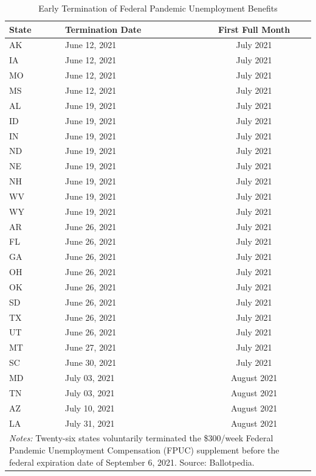 \begin{table}[htbp]
\centering
\caption{Early Termination of Federal Pandemic Unemployment Benefits}
\label{tab:treatment_timing}
\begin{tabular}{llc}
\hline\hline
State & Termination Date & First Full Month \\
\hline
AK & June 12, 2021 & July 2021 \\
IA & June 12, 2021 & July 2021 \\
MO & June 12, 2021 & July 2021 \\
MS & June 12, 2021 & July 2021 \\
AL & June 19, 2021 & July 2021 \\
ID & June 19, 2021 & July 2021 \\
IN & June 19, 2021 & July 2021 \\
ND & June 19, 2021 & July 2021 \\
NE & June 19, 2021 & July 2021 \\
NH & June 19, 2021 & July 2021 \\
WV & June 19, 2021 & July 2021 \\
WY & June 19, 2021 & July 2021 \\
AR & June 26, 2021 & July 2021 \\
FL & June 26, 2021 & July 2021 \\
GA & June 26, 2021 & July 2021 \\
OH & June 26, 2021 & July 2021 \\
OK & June 26, 2021 & July 2021 \\
SD & June 26, 2021 & July 2021 \\
TX & June 26, 2021 & July 2021 \\
UT & June 26, 2021 & July 2021 \\
MT & June 27, 2021 & July 2021 \\
SC & June 30, 2021 & July 2021 \\
MD & July 03, 2021 & August 2021 \\
TN & July 03, 2021 & August 2021 \\
AZ & July 10, 2021 & August 2021 \\
LA & July 31, 2021 & August 2021 \\
\hline
\multicolumn{3}{p{10cm}}{\footnotesize \textit{Notes:} Twenty-six states voluntarily terminated the \$300/week Federal Pandemic Unemployment Compensation (FPUC) supplement before the federal expiration date of September 6, 2021. Source: Ballotpedia.} \\
\hline\hline
\end{tabular}
\end{table}

